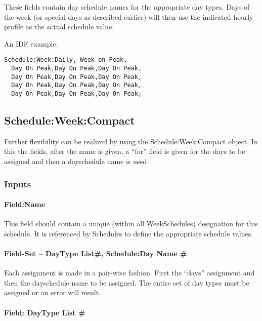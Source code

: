 These fields contain day schedule names for the appropriate day types. Days of the week (or special days as described earlier) will then use the indicated hourly profile as the actual schedule value.

An IDF example:

\begin{lstlisting}
Schedule:Week:Daily, Week on Peak,
  Day On Peak,Day On Peak,Day On Peak,
  Day On Peak,Day On Peak,Day On Peak,
  Day On Peak,Day On Peak,Day On Peak,
  Day On Peak,Day On Peak,Day On Peak;
\end{lstlisting}

\subsection{Schedule:Week:Compact}\label{scheduleweekcompact}

Further flexibility can be realized by using the Schedule:Week:Compact object. In this the fields, after the name is given, a ``for'' field is given for the days to be assigned and then a dayschedule name is used.

\subsubsection{Inputs}\label{inputs-5-026}

\paragraph{Field:Name}\label{fieldname}

This field should contain a unique (within all WeekSchedules) designation for this schedule. It is referenced by Schedules to define the appropriate schedule values.

\paragraph{Field-Set -- DayType List\#, Schedule:Day Name \#}\label{field-set-daytype-list-scheduleday-name}

Each assignment is made in a pair-wise fashion. First the ``days'' assignment and then the dayschedule name to be assigned. The entire set of day types must be assigned or an error will result.

\paragraph{Field: DayType List \#}\label{field-daytype-list}


